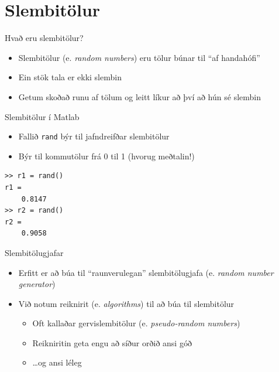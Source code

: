 \documentclass{beamer}
\begin{document}
\section{Slembitölur}

\begin{frame}{Hvað eru slembitölur?}
\begin{itemize}
 \item Slembitölur (e. \emph{random numbers}) eru tölur búnar til ``af handahófi''
 \item Ein stök tala er ekki slembin
 \item Getum skoðað runu af tölum og leitt líkur að því að hún sé slembin
\end{itemize}
\end{frame}

\begin{frame}[fragile]{Slembitölur í Matlab}
\begin{itemize}
 \item Fallið \texttt{rand} býr til jafndreifðar slembitölur
 \item Býr til kommutölur frá 0 til 1 (hvorug meðtalin!)
\end{itemize}
\begin{verbatim}
>> r1 = rand()
r1 =
    0.8147
>> r2 = rand()
r2 =
    0.9058
\end{verbatim}
\end{frame}

\begin{frame}{Slembitölugjafar}
\begin{itemize}
 \item Erfitt er að búa til ``raunverulegan'' slembitölugjafa (e. \emph{random number generator})
 \item Við notum reiknirit (e. \emph{algorithms}) til að búa til slembitölur
 \begin{itemize}
  \item Oft kallaðar gervislembitölur (e. \emph{pseudo-random numbers})
  \item Reikniritin geta engu að síður orðið ansi góð \pause
  \item \ldots og ansi léleg
 \end{itemize}
\end{itemize}
\end{frame}
\end{document}
